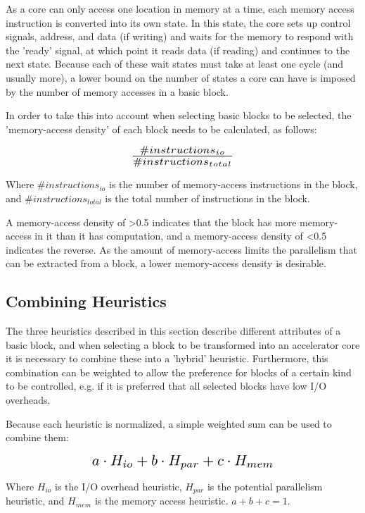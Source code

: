 \documentclass{UoYCSproject}
\begin{document}
As a core can only access one location in memory at a time, each memory access instruction is converted into its own state.
In this state, the core sets up control signals, address, and data (if writing) and waits for the memory to respond
with the 'ready' signal, at which point it reads data (if reading) and continues to the next state. Because each of these
wait states must take at least one cycle (and usually more), a lower bound on the number of states a core can have is imposed
by the number of memory accesses in a basic block.

In order to take this into account when selecting basic blocks to be selected, the 'memory-access density' of each block needs
to be calculated, as follows:

\begin{equation}
\scalebox{1.5}{$\frac{\#instructions_{io}}{\#instructions_{total}}$}
\end{equation}

Where \(\#instructions_{io}\) is the number of memory-access instructions in the block, and \(\#instructions_{total}\) is the
total number of instructions in the block.

A memory-access density of >0.5 indicates that the block has more memory-access in it than it has computation, and a memory-access
density of <0.5 indicates the reverse. As the amount of memory-access limits the parallelism that can be extracted from a block,
a lower memory-access density is desirable.

\subsection{Combining Heuristics}

The three heuristics described in this section describe different attributes of a basic block, and when selecting a block
to be transformed into an accelerator core it is necessary to combine these into a 'hybrid' heuristic. Furthermore,
this combination can be weighted to allow the preference for blocks of a certain kind to be controlled, e.g. if it is preferred
that all selected blocks have low I/O overheads.

Because each heuristic is normalized, a simple weighted sum can be used to combine them:

\begin{equation}
\scalebox{1.5}{$a \cdot H_{io} + b \cdot H_{par} + c \cdot H_{mem}$}
\end{equation}

Where \(H_{io}\) is the I/O overhead heuristic, \(H_{par}\) is the potential parallelism heuristic, and \(H_{mem}\) is the
memory access heuristic. \(a + b + c = 1\).
\end{document}
